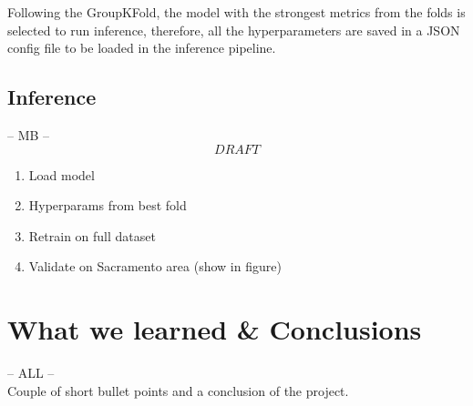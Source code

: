 \documentclass[NOTE, disdraft=true, UKenglish]{\DISCDTLATEXPATH UCLCDTDISdoc}
\begin{document}
Following the GroupKFold, the model with the strongest metrics from the folds is selected to run inference, therefore, all the hyperparameters are saved in a JSON config file to be loaded in the inference pipeline.
\subsection{Inference}
-- MB --\\
\[DRAFT\]
\begin{enumerate}
    \item Load model
    \item Hyperparams from best fold
    \item Retrain on full dataset
    \item Validate on Sacramento area (show in figure)
\end{enumerate}
\section{What we learned \& Conclusions}
\label{sec:conclusion}
%
-- ALL --\\
Couple of short bullet points and a conclusion of the project.
\end{document}
